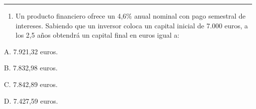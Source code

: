 \documentclass[
  letterpaper,
  DIV=11,
  numbers=noendperiod]{scrreprt}
\providecommand{\tightlist}{%
  \setlength{\itemsep}{0pt}\setlength{\parskip}{0pt}}\usepackage{longtable,booktabs,array}
\begin{document}
\begin{center}\rule{0.5\linewidth}{0.5pt}\end{center}

\begin{enumerate}
\def\labelenumi{\arabic{enumi}.}
\setcounter{enumi}{94}
\tightlist
\item
  Un producto financiero ofrece un 4,6\% anual nominal con pago
  semestral de intereses. Sabiendo que un inversor coloca un capital
  inicial de 7.000 euros, a los 2,5 años obtendrá un capital final en
  euros igual a:
\end{enumerate}

A. 7.921,32 euros.

B. 7.832,98 euros.

C. 7.842,89 euros.

D. 7.427,59 euros.
\end{document}
